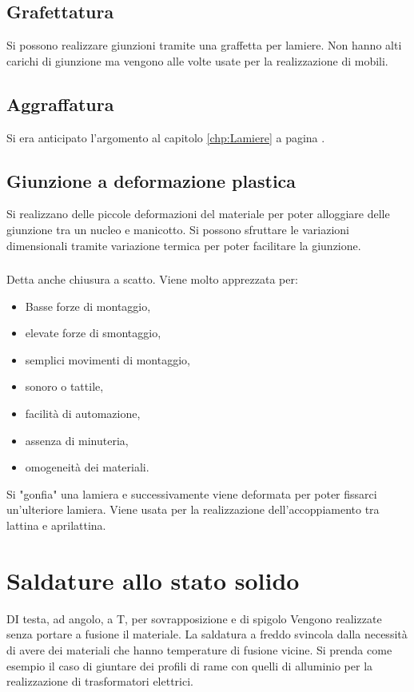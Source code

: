 \subsection{Grafettatura}
Si possono realizzare giunzioni tramite una graffetta per lamiere.
Non hanno alti carichi di giunzione ma vengono alle volte usate per la realizzazione di mobili.

\subsection{Aggraffatura}
Si era anticipato l'argomento al capitolo \ref{chp:Lamiere} a pagina \pageref{chp:Lamiere}.

\subsection{Giunzione a deformazione plastica}
Si realizzano delle piccole deformazioni del materiale per poter alloggiare delle giunzione tra un nucleo e manicotto.
Si possono sfruttare le variazioni dimensionali tramite variazione termica per poter facilitare la giunzione.

\subsubsection{}
Detta anche chiusura a scatto. Viene molto apprezzata per:
\begin{itemize}
\item Basse forze di montaggio,
\item elevate forze di smontaggio,
\item semplici movimenti di montaggio,
\item {} sonoro o tattile,
\item facilità di automazione,
\item assenza di minuteria,
\item omogeneità dei materiali.
\end{itemize}

Si "gonfia" una lamiera e successivamente viene deformata per poter fissarci un'ulteriore lamiera. Viene usata per la realizzazione dell'accoppiamento tra lattina e aprilattina.


\section{Saldature allo stato solido}
DI testa, ad angolo, a T, per sovrapposizione e di spigolo
\todo{\\Elenco}
Vengono realizzate senza portare a fusione il materiale.
La saldatura a freddo svincola dalla necessità di avere dei materiali che hanno temperature di fusione vicine.
Si prenda come esempio il caso di giuntare dei profili di rame con quelli di alluminio per la realizzazione di trasformatori elettrici.

